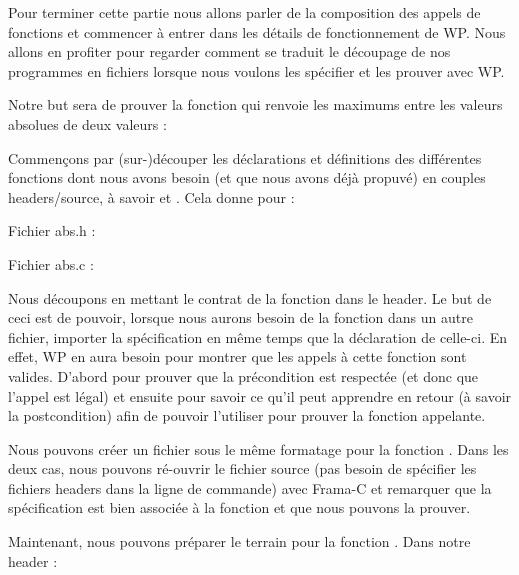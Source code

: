 Pour terminer cette partie nous allons parler de la composition des appels de
fonctions et commencer à entrer dans les détails de fonctionnement de WP. Nous
allons en profiter pour regarder comment se traduit le découpage de nos 
programmes en fichiers lorsque nous voulons les spécifier et les prouver avec WP.



Notre but sera de prouver la fonction  qui renvoie les maximums 
entre les valeurs absolues de deux valeurs :






Commençons par (sur-)découper les déclarations et définitions des différentes
fonctions dont nous avons besoin (et que nous avons déjà propuvé) en couples 
headers/source, à savoir  et . Cela donne pour
 :



Fichier abs.h :



Fichier abs.c :




Nous découpons en mettant le contrat de la fonction dans le header. Le but de
ceci est de pouvoir, lorsque nous aurons besoin de la fonction dans un autre 
fichier, importer la spécification en même temps que la déclaration de 
celle-ci. En effet, WP en aura besoin pour montrer que les appels à cette 
fonction sont valides. D'abord pour prouver que la précondition est respectée
(et donc que l'appel est légal) et ensuite pour savoir ce qu'il peut apprendre
en retour (à savoir la postcondition) afin de pouvoir l'utiliser pour prouver
la fonction appelante.



Nous pouvons créer un fichier sous le même formatage pour la fonction .
Dans les deux cas, nous pouvons ré-ouvrir le fichier source (pas besoin de 
spécifier les fichiers headers dans la ligne de commande) avec Frama-C et 
remarquer que la spécification est bien associée à la fonction et que nous
pouvons la prouver.



Maintenant, nous pouvons préparer le terrain pour la fonction . 
Dans notre header :



